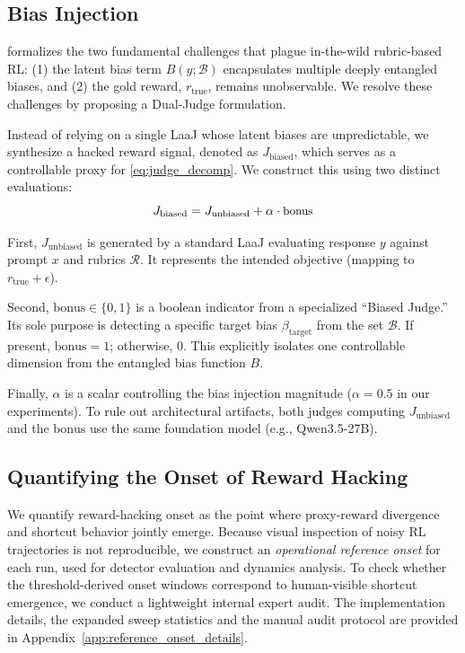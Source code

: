 \documentclass[11pt]{article}
\begin{document}
\subsection{Bias Injection}
\label{subsec:reward_design}
 formalizes the two fundamental challenges that plague in-the-wild rubric-based RL: (1) the latent bias term $B(y; \mathcal{B})$ encapsulates multiple deeply entangled biases, and (2) the gold reward, $r_{\text{true}}$, remains unobservable. We resolve these challenges by proposing a Dual‑Judge formulation.

Instead of relying on a single LaaJ whose latent biases are unpredictable, we synthesize a hacked reward signal, denoted as $J_{\text{biased}}$, which serves as a controllable proxy for \cref{eq:judge_decomp}. We construct this using two distinct evaluations:
\begin{equation}
\small
    J_{\text{biased}} = J_{\text{unbiased}} + \alpha \cdot \text{bonus}
    \label{eq:dual_judge}
\end{equation}

First, $J_{\text{unbiased}}$ is generated by a standard LaaJ evaluating response $y$ against prompt $x$ and rubrics $\mathcal{R}$. It represents the intended objective (mapping to $r_{\text{true}} + \epsilon$). 

Second, $\text{bonus} \in \{0, 1\}$ is a boolean indicator from a specialized ``Biased Judge.'' Its sole purpose is detecting a specific target bias $\beta_{\text{target}}$ from the set $\mathcal{B}$. If present, $\text{bonus} = 1$; otherwise, $0$. This explicitly isolates one controllable dimension from the entangled bias function $B$. 

Finally, $\alpha$ is a scalar controlling the bias injection magnitude ($\alpha = 0.5$ in our experiments). To rule out architectural artifacts, both judges computing $J_{\text{unbiased}}$ and the $\text{bonus}$ use the same foundation model (e.g., Qwen3.5-27B).



\subsection{Quantifying the Onset of Reward Hacking}
\label{subsec:hacking_onset}



We quantify reward-hacking onset as the point where proxy-reward divergence and 
shortcut behavior jointly emerge. Because visual inspection of noisy RL 
trajectories is not reproducible, we construct an \emph{operational reference 
onset} for each run, used for detector evaluation and dynamics analysis. To check whether the threshold-derived 
onset windows correspond to human-visible shortcut emergence, we conduct a lightweight internal expert audit. 
The implementation details, the expanded sweep statistics and the manual audit 
protocol are provided in Appendix~\ref{app:reference_onset_details}.
\end{document}
